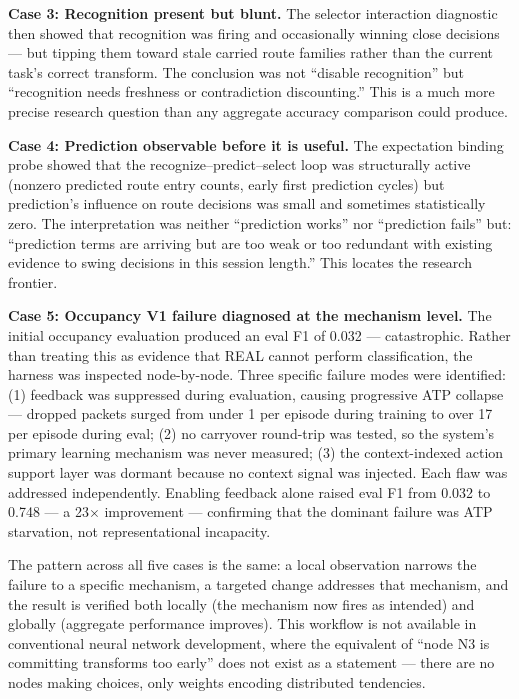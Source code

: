 \documentclass[letterpaper]{article}
\begin{document}
\textbf{Case 3: Recognition present but blunt.} The selector interaction diagnostic then showed that recognition was firing and occasionally winning close decisions — but tipping them toward stale carried route families rather than the current task's correct transform. The conclusion was not ``disable recognition'' but ``recognition needs freshness or contradiction discounting.'' This is a much more precise research question than any aggregate accuracy comparison could produce.

\textbf{Case 4: Prediction observable before it is useful.} The expectation binding probe showed that the recognize–predict–select loop was structurally active (nonzero predicted route entry counts, early first prediction cycles) but prediction's influence on route decisions was small and sometimes statistically zero. The interpretation was neither ``prediction works'' nor ``prediction fails'' but: ``prediction terms are arriving but are too weak or too redundant with existing evidence to swing decisions in this session length.'' This locates the research frontier.

\textbf{Case 5: Occupancy V1 failure diagnosed at the mechanism level.} The initial occupancy evaluation produced an eval F1 of 0.032 — catastrophic. Rather than treating this as evidence that REAL cannot perform classification, the harness was inspected node-by-node. Three specific failure modes were identified: (1) feedback was suppressed during evaluation, causing progressive ATP collapse — dropped packets surged from under 1 per episode during training to over 17 per episode during eval; (2) no carryover round-trip was tested, so the system's primary learning mechanism was never measured; (3) the context-indexed action support layer was dormant because no context signal was injected. Each flaw was addressed independently. Enabling feedback alone raised eval F1 from 0.032 to 0.748 — a 23$\times$ improvement — confirming that the dominant failure was ATP starvation, not representational incapacity.

The pattern across all five cases is the same: a local observation narrows the failure to a specific mechanism, a targeted change addresses that mechanism, and the result is verified both locally (the mechanism now fires as intended) and globally (aggregate performance improves). This workflow is not available in conventional neural network development, where the equivalent of ``node N3 is committing transforms too early'' does not exist as a statement — there are no nodes making choices, only weights encoding distributed tendencies.
\end{document}
